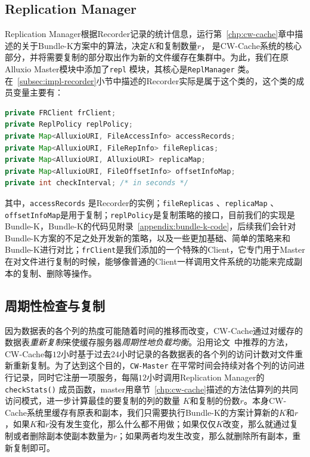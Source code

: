 \subsection{Replication Manager}

\par Replication Manager根据Recorder记录的统计信息，运行第~\ref{chp:cw-cache}章中描述的关于Bundle-K方案中的算法，决定$K$和复制数量$r$， 是CW-Cache系统的核心部分，并将需要复制的部分取出作为新的文件缓存在集群中。为此，我们在原Alluxio Master模块中添加了\verb|repl| 模块，其核心是\verb|ReplManager| 类。在~\ref{subsec:impl-recorder}小节中描述的Recorder实际是属于这个类的，这个类的成员变量主要有：

\begin{lstlisting}[language=java]
private FRClient frClient;
private ReplPolicy replPolicy;
private Map<AlluxioURI, FileAccessInfo> accessRecords;
private Map<AlluxioURI, FileRepInfo> fileReplicas;
private Map<AlluxioURI, AlluxioURI> replicaMap;
private Map<AlluxioURI, FileOffsetInfo> offsetInfoMap;
private int checkInterval; /* in seconds */
\end{lstlisting}

\par 其中，\verb|accessRecords| 是Recorder的实例；\verb|fileReplicas| 、\verb|replicaMap| 、\verb|offsetInfoMap|是用于复制；\verb|replPolicy|是复制策略的接口，目前我们的实现是Bundle-K，Bundle-K的代码见附录~\ref{appendix:bundle-k-code}，后续我们会针对Bundle-K方案的不足之处开发新的策略，以及一些更加基础、简单的策略来和Bundle-K进行对比；\verb|frClient|是我们添加的一个特殊的Client，它专门用于Master在对文件进行复制的时候，能够像普通的Client一样调用文件系统的功能来完成副本的复制、删除等操作。

\subsection{周期性检查与复制}

\par 因为数据表的各个列的热度可能随着时间的推移而改变，CW-Cache通过对缓存的数据表\emph{重新复制}来使缓存服务器\emph{周期性地负载均衡}。沿用论文~\cite{ananthanarayanan2011scarlett}中推荐的方法，CW-Cache每$12$小时基于过去$24$小时记录的各数据表的各个列的访问计数对文件重新重新复制。为了达到这个目的，\texttt{CW-Master} 在平常时间会持续对各个列的访问进行记录，同时它注册一项服务，每隔$12$小时调用Replication Manager的\texttt{checkStats()} 成员函数，master用章节~\ref{chp:cw-cache}描述的方法估算列的共同访问模式，进一步计算最佳的要复制的列的数量 $K$和复制的份数$r$。本身CW-Cache系统里缓存有原表和副本，我们只需要执行Bundle-K的方案计算新的$K$和$r$，如果$K$和$r$没有发生变化，那么什么都不用做；如果仅仅$K$改变，那么就通过复制或者删除副本使副本数量为$r$；如果两者均发生改变，那么就删除所有副本，重新复制即可。

